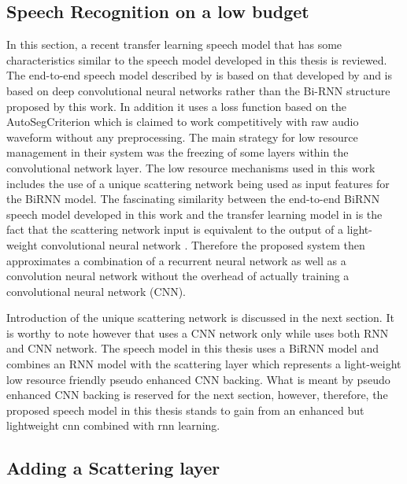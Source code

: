 \subsection{Speech Recognition on a low budget}

In this section, a recent transfer learning speech model \citep{kunze2017transfer} that has some characteristics similar to the speech model developed in this thesis is reviewed.  The end-to-end speech model described by \cite{kunze2017transfer} is based on that developed by \cite{collobert2016wav2letter} and is based on deep convolutional neural networks rather than the Bi-RNN structure proposed by this work.  In addition it uses a loss function based on the AutoSegCriterion which is claimed to work competitively with raw audio waveform without any preprocessing.  The main strategy for low resource management in their system was the freezing of some layers within the convolutional network layer.  The low resource mechanisms used in this work includes the use of a unique scattering network being used as input features for the BiRNN model.  The fascinating similarity between the end-to-end BiRNN speech model developed in this work and the transfer learning model in \cite{kunze2017transfer} is the fact that the scattering network input is equivalent to the output of a light-weight convolutional neural network \cite{hannun2014first}.  Therefore the proposed system then approximates a combination of a recurrent neural network as well as a convolution neural network without the overhead of actually training a convolutional neural network (CNN)\citep{szegedy2015going}.

Introduction of the unique scattering network is discussed in the next section.  It is worthy to note however that \cite{kunze2017transfer} uses a CNN network only while \citep{amodei2016deep} uses both RNN and CNN network.  The speech model in this thesis uses a BiRNN model and combines an RNN model with the scattering layer which represents a light-weight low resource friendly pseudo enhanced CNN backing.  What is meant by pseudo enhanced CNN backing is reserved for the next section, however, therefore, the proposed speech model in this thesis stands to gain from an enhanced but lightweight \acrshort{cnn} combined with \acrshort{rnn} learning.

\subsection{Adding a Scattering layer}

